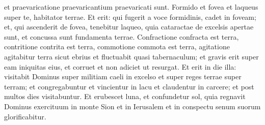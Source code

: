 \begin{biblechapter}
\begin{biblechapter}
\begin{biblechapter}
\begin{biblechapter}
\begin{biblechapter}
\begin{biblechapter}
\begin{biblechapter}
\begin{biblechapter}
\begin{biblechapter}
\begin{biblechapter}
\begin{biblechapter}
\begin{biblechapter}
\begin{biblechapter}
\begin{biblechapter}
\begin{biblechapter}
\begin{biblechapter}
\begin{biblechapter}
\begin{biblechapter}
\begin{biblechapter}
\begin{biblechapter}
\begin{biblechapter}
\begin{biblechapter}
\begin{biblechapter}
\begin{biblechapter}
 et praevaricatione praevaricantium praevaricati sunt.
 \verse Formido et fovea et laqueus super te,
 habitator terrae.
 \verse Et erit: qui fugerit a voce formidinis, cadet in foveam;
 et, qui ascenderit de fovea,
 tenebitur laqueo,
 quia cataractae de excelsis apertae sunt,
 et concussa sunt fundamenta terrae. 
\verse Confractione confracta est terra,
 contritione contrita est terra,
 commotione commota est terra,
 \verse agitatione agitabitur terra sicut ebrius
 et fluctuabit quasi tabernaculum;
 et gravis erit super eam iniquitas eius,
 et corruet et non adiciet ut resurgat.
 \verse Et erit in die illa:
 visitabit Dominus super militiam caeli in excelso
 et super reges terrae super terram;
 \verse et congregabuntur et vincientur in lacu
 et claudentur in carcere;
 et post multos dies visitabuntur.
 \verse Et erubescet luna, et confundetur sol,
 quia regnavit Dominus exercituum in monte Sion et in Ierusalem
 et in conspectu senum suorum glorificabitur.
 

\end{biblechapter}
\end{biblechapter}
\end{biblechapter}
\end{biblechapter}
\end{biblechapter}
\end{biblechapter}
\end{biblechapter}
\end{biblechapter}
\end{biblechapter}
\end{biblechapter}
\end{biblechapter}
\end{biblechapter}
\end{biblechapter}
\end{biblechapter}
\end{biblechapter}
\end{biblechapter}
\end{biblechapter}
\end{biblechapter}
\end{biblechapter}
\end{biblechapter}
\end{biblechapter}
\end{biblechapter}
\end{biblechapter}
\end{biblechapter}
